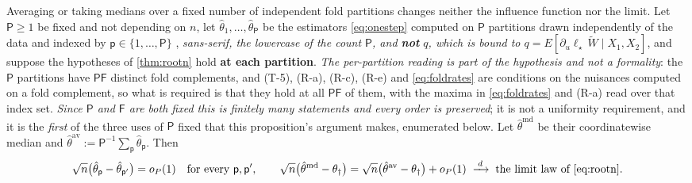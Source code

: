 \begin{proposition}\label{prp:medianpart}
Averaging or taking medians over a fixed number of independent fold partitions changes neither the influence
function nor the limit.
Let $\mathsf P\ge1$ be fixed and not depending on $n$, let
$\hat\theta_1,\dots,\hat\theta_{\mathsf P}$ be the estimators \eqref{eq:onestep} computed on $\mathsf P$
partitions drawn independently of the data and indexed by $\mathsf p\in\{1,\dots,\mathsf P\}$
, \emph{sans-serif, the lowercase of the count $\mathsf P$, and \textbf{not} $q$, which is bound to
$q=E[\partial_u\ell_\star\,\widetilde W\mid X_1,X_2]$}, 
and suppose the hypotheses of \cref{thm:rootn} hold
\textbf{at each partition}. \emph{The per-partition reading is part of the hypothesis and not a formality}:
the $\mathsf P$ partitions have $\mathsf P\mathsf F$ distinct fold complements, and (T-5), (R-a), (R-c),
(R-e) and \eqref{eq:foldrates} are conditions on the nuisances computed on a fold complement, so what is
required is that they hold at all $\mathsf P\mathsf F$ of them, with the maxima in \eqref{eq:foldrates} and
(R-a) read over that index set. \emph{Since $\mathsf P$ and $\mathsf F$ are both fixed this is finitely many
statements and every order is preserved}; it is not a uniformity requirement, and it is the \emph{first}
of the three uses of $\mathsf P$ fixed that this proposition's argument makes, enumerated below.
Let
$\hat\theta^{\mathrm{md}}$ be their coordinatewise
median and $\hat\theta^{\mathrm{av}}:=\mathsf P^{-1}\sum_{\mathsf p}\hat\theta_{\mathsf p}$. Then
\[
\sqrt n\big(\hat\theta_{\mathsf p}-\hat\theta_{\mathsf p'}\big)=o_P(1)
\quad\text{for every }\mathsf p,\mathsf p',
\qquad
\sqrt n\big(\hat\theta^{\mathrm{md}}-\theta_\dagger\big)
=\sqrt n\big(\hat\theta^{\mathrm{av}}-\theta_\dagger\big)+o_P(1)
\;\xrightarrow{\;d\;}\;\text{the limit law of \eqref{eq:rootn}} .
\]
\end{proposition}
